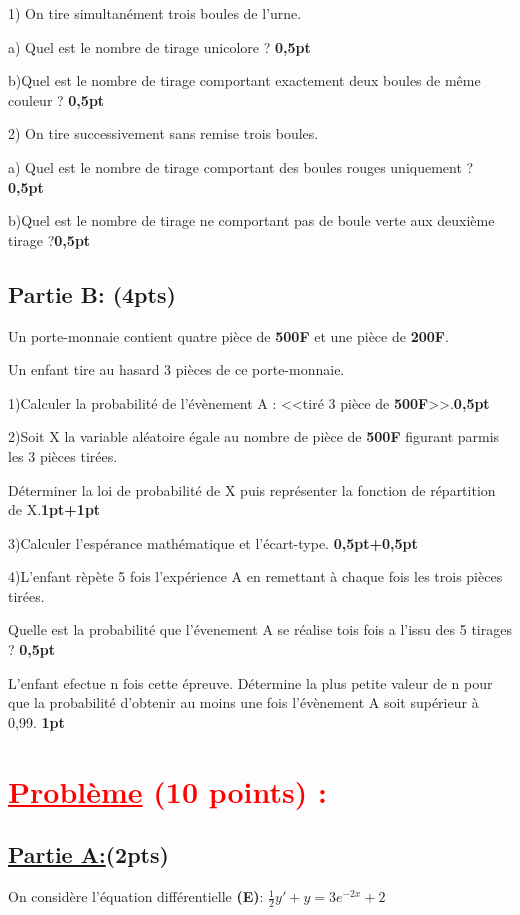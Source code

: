 \documentclass[12pt]{article}
\begin{document}
1) On tire simultanément trois boules de l'urne.

a) Quel est le nombre de tirage unicolore ? \textbf{0,5pt}

b)Quel est le nombre de tirage comportant exactement deux boules de même couleur ? \textbf{0,5pt}

2) On tire successivement sans remise trois boules.

a) Quel est le nombre de tirage comportant des boules rouges uniquement ? \textbf{0,5pt}

b)Quel est le nombre de tirage ne comportant pas de boule verte aux deuxième tirage ?\textbf{0,5pt}
\subsection*{Partie B: (4pts)}
Un porte-monnaie contient quatre pièce de \textbf{500F} et une pièce de \textbf{200F}.

Un enfant tire au hasard 3 pièces de ce porte-monnaie.

1)Calculer la probabilité de l'évènement A : <<tiré 3 pièce de \textbf{500F}>>.\textbf{0,5pt}

2)Soit X la variable aléatoire égale au nombre de pièce de \textbf{500F} figurant parmis les 3 pièces tirées.

Déterminer la loi de probabilité de X puis représenter la fonction de répartition de X.\textbf{1pt+1pt}

3)Calculer l'espérance mathématique et l'écart-type. \textbf{0,5pt+0,5pt}

4)L'enfant rèpète 5 fois l'expérience A en remettant à chaque fois les trois pièces tirées.

Quelle est la probabilité que l'évenement A se réalise tois fois a l'issu des 5 tirages ? \textbf{0,5pt}

L'enfant efectue n fois cette épreuve. Détermine la plus petite valeur de n pour que la probabilité d'obtenir au moins une fois l'évènement A soit supérieur à 0,99. \textbf{1pt}
\section*{\textcolor{red}{\underline{Problème} (10 points) :}}
\subsection*{\underline{Partie A:}(2pts)}
On considère l'équation différentielle \textbf{(E)}: $\frac{1}{2}y'+y=3e^{-2x}+2$
\end{document}
